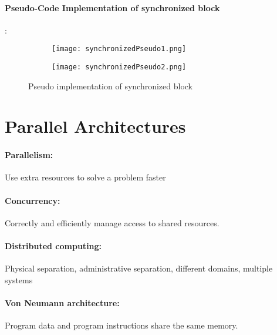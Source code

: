 \documentclass[8pt]{extreport}
\begin{document}
\paragraph{Pseudo-Code Implementation of synchronized block}:
\begin{figure}[h!]
  \begin{subfigure}[b]{0.4\linewidth}
  \texttt{[image: synchronizedPseudo1.png]}

  \label{fig: synchronized block}
  \end{subfigure}
\begin{subfigure}[b]{0.4\linewidth}
  \texttt{[image: synchronizedPseudo2.png]}
 
  \label{fig: wait/notify}
\end{subfigure}
  \caption{Pseudo implementation of synchronized block}
\end{figure}

\section{Parallel Architectures}
\paragraph{Parallelism:} Use extra resources to solve a problem faster
\paragraph{Concurrency:} Correctly and efficiently manage access to shared resources. 
\paragraph{Distributed computing:} Physical separation, administrative separation, different domains, multiple systems
\paragraph{Von Neumann architecture:} Program data and program instructions share the same memory.
\end{document}
